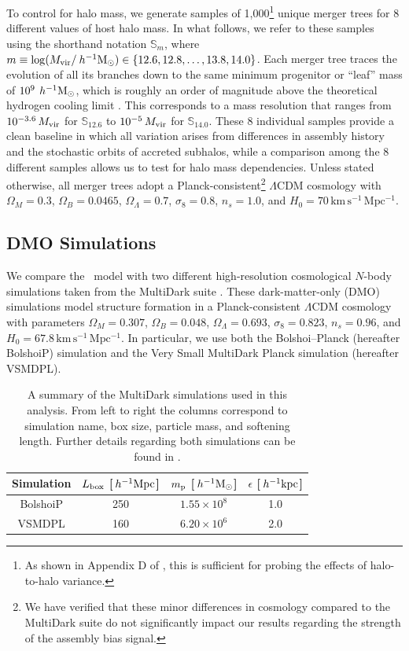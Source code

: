 \documentclass[twocolumn,apj,numberedappendix,twocolappendix,iop]{openjournal}
\begin{document}
To control for halo mass, we generate samples of 1,000\footnote{As shown in Appendix D of \citealt{Monzon.etal.24}, this is sufficient for probing the effects of halo-to-halo variance.} unique merger trees for 8 different values of host halo mass. In what follows, we refer to these samples using the shorthand notation $\mathbb{S}_m$, where $m \equiv \log(M_{\rm vir}/\>h^{-1}\rm M_\odot) \in \{12.6, 12.8, \dots, 13.8, 14.0\}$. Each merger tree traces the evolution of all its branches down to the same minimum progenitor or ``leaf'' mass of $10^{9}\,\>h^{-1}\rm M_\odot$, which is roughly an order of magnitude above the theoretical hydrogen cooling limit \citep{Greif.etal.08}. This corresponds to a mass resolution that ranges from $10^{-3.6}\,M_{\rm vir}$ for $\mathbb{S}_{12.6}$ to $10^{-5}\,M_{\rm vir}$ for $\mathbb{S}_{14.0}$. These 8 individual samples provide a clean baseline in which all variation arises from differences in assembly history and the stochastic orbits of accreted subhalos, while a comparison among the 8 different samples allows us to test for halo mass dependencies. Unless stated otherwise, all merger trees adopt a Planck-consistent\footnote{We have verified that these minor differences in cosmology compared to the MultiDark suite do not significantly impact our results regarding the strength of the assembly bias signal.} $\Lambda$CDM cosmology with $\Omega_{M}=0.3$, $\Omega_{B}=0.0465$, $\Omega_{\Lambda}=0.7$, $\sigma_8 = 0.8$, $n_s=1.0$, and $H_0=70\,\mathrm{km\,s^{-1}\,Mpc^{-1}}$.

\subsection{DMO Simulations}
\label{sec:sims}

We compare the \SatGen\ model with two different high-resolution cosmological $N$-body simulations taken from the MultiDark suite \citep{Klypin.etal.11, Riebe.etal.13, Klypin.etal.16, RodriguezPuebla.etal.16}. These dark-matter-only (DMO) simulations model structure formation in a Planck-consistent $\Lambda$CDM cosmology with parameters $\Omega_{M}=0.307$, $\Omega_{B}=0.048$, $\Omega_{\Lambda}=0.693$, $\sigma_8 = 0.823$, $n_s=0.96$, and $H_0=67.8\,\mathrm{km\,s^{-1}\,Mpc^{-1}}$. In particular, we use both the Bolshoi--Planck (hereafter BolshoiP) simulation and the Very Small MultiDark Planck simulation (hereafter VSMDPL). 
%
\begin{table}[htbp]
\centering
    \begin{tabular}{c|c|c|c}
    \hline
    \hline
    Simulation & $L_{\rm box}$ [$\>h^{-1}{\rm {Mpc}}$] & $m_{\rm p}$ [$\>h^{-1}\rm M_\odot$] & $\epsilon$ [$\>{h^{-1}{\rm kpc}}$] \\
    \hline
    BolshoiP & 250 & $1.55 \times 10^{8}$ & 1.0  \\
    VSMDPL   & 160 & $6.20 \times 10^{6}$ & 2.0 \\
    \hline
    \end{tabular}
    \caption{A summary of the MultiDark simulations used in this analysis. From left to right the columns correspond to simulation name, box size, particle mass, and softening length. Further details regarding both simulations can be found in \cite{Klypin.etal.11, Riebe.etal.13, Klypin.etal.16, RodriguezPuebla.etal.16}.}
    \label{tab:sims}
\end{table}
\end{document}
